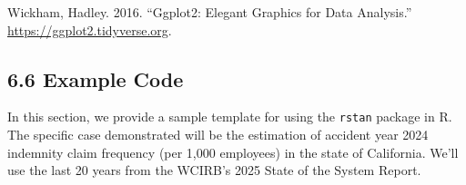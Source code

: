 \documentclass[
]{article}
\begin{document}
Wickham, Hadley. 2016. ``Ggplot2: Elegant Graphics for Data Analysis.''
\url{https://ggplot2.tidyverse.org}.

\hypertarget{example-code}{%
\subsection{6.6 Example Code}\label{example-code}}

In this section, we provide a sample template for using the
\texttt{rstan} package in R. The specific case demonstrated will be the
estimation of accident year 2024 indemnity claim frequency (per 1,000
employees) in the state of California. We'll use the last 20 years from
the WCIRB's 2025 State of the System Report.
\end{document}
